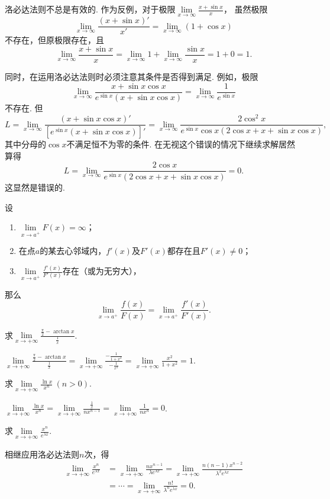 \begin{example}
\def\l{\lim\limits_{x\to\infty}}%
\def\a{\l\frac{x+\sin x}{x}}%
洛必达法则不总是有效的.
作为反例，对于极限\(\a\)，
虽然极限\[
\l\frac{(x+\sin x)'}{x'} = \l(1+\cos x)
\]不存在，但原极限存在，且
\[
\a = \l1+\l\frac{\sin x}{x} = 1 + 0 = 1.
\]

\def\l{\lim\limits_{x\to\infty}}%
\def\a{\l\frac{x+\sin x \cos x}{e^{\sin x}(x+\sin x \cos x)}}%
同时，在运用洛必达法则时必须注意其条件是否得到满足.
例如，极限\[
\a = \l\frac{1}{e^{\sin x}}
\]不存在.
但\[
L = \l\frac{(x+\sin x \cos x)'}{[e^{\sin x}(x+\sin x \cos x)]'} = \l\frac{2\cos^2 x}{e^{\sin x}\cos x(2\cos x + x + \sin x \cos x)},
\]其中分母的\(\cos x\)不满足恒不为零的条件.
在无视这个错误的情况下继续求解居然算得
\[
L = \l\frac{2\cos x}{e^{\sin x}(2\cos x + x + \sin x \cos x)} = 0.
\]
这显然是错误的.
\end{example}

\begin{theorem}\label{theorem:微分中值定理.洛必达法则3}
\def\l{\lim\limits_{x \to a^+}}
设\begin{enumerate}
\item \(\l F(x) = \infty\)；
\item 在点\(a\)的某去心邻域内，\(f'(x)\)及\(F'(x)\)都存在且\(F'(x) \neq 0\)；
\item \(\l\frac{f'(x)}{F'(x)}\)存在（或为无穷大），
\end{enumerate}那么\[
\l\frac{f(x)}{F(x)} = \l\frac{f'(x)}{F'(x)}.
\]
\end{theorem}

\begin{example}
\def\l{\lim\limits_{x\to+\infty}}%
求\(\l \frac{\frac{\pi}{2} - \arctan x}{\frac{1}{x}}\).
\begin{solution}
\(\l \frac{\frac{\pi}{2} - \arctan x}{\frac{1}{x}}
= \l \frac{-\frac{1}{1+x^2}}{-\frac{1}{x^2}}
= \l \frac{x^2}{1+x^2} = 1\).
\end{solution}
\end{example}

\begin{example}
\def\l{\lim\limits_{x\to+\infty}}%
求\(\l \frac{\ln x}{x^n}\ (n>0)\).
\begin{solution}
\(\l \frac{\ln x}{x^n}
= \l \frac{\frac{1}{x}}{n x^{n-1}}
= \l \frac{1}{n x^n} = 0\).
\end{solution}
\end{example}

\begin{example}
\def\l{\lim\limits_{x\to+\infty}}%
求\(\l \frac{x^n}{e^{\lambda x}}\).
\begin{solution}
相继应用洛必达法则\(n\)次，得\begin{align*}
\l \frac{x^n}{e^{\lambda x}}
&= \l \frac{n x^{n-1}}{\lambda e^{\lambda x}}
= \l \frac{n(n-1) x^{n-2}}{\lambda^2 e^{\lambda x}} \\
&= \dotsb = \l \frac{n!}{\lambda^n e^{\lambda x}}
= 0.
\end{align*}
\end{solution}
\end{example}

